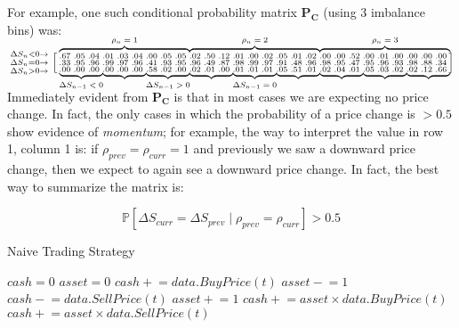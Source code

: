 \documentclass[12pt]{article}
\newcommand{\pluseq}{\mathrel{+}=}
\newcommand{\mineq}{\mathrel{-}=}
\newcommand\undermat[2]{%
  \makebox[0pt][l]{$\smash{\underbrace{\phantom{%
    \begin{smallmatrix}#2\end{smallmatrix}}}_{\text{$#1$}}}$}#2}
\newcommand\overmat[2]{%
  \makebox[0pt][l]{$\smash{\overbrace{\phantom{%
    \begin{smallmatrix}#2\end{smallmatrix}}}^{\text{$#1$}}}$}#2}
\newcommand\mat[1]{\boldsymbol{#1}}
\begin{document}
For example, one such conditional probability matrix $\mat{P_C}$ (using 3 imbalance bins) was:

$$  \begin{smallmatrix}
    \Delta S_n < 0 \rightarrow \\
    \Delta S_n = 0 \rightarrow \\
    \Delta S_n > 0 \rightarrow
  \end{smallmatrix}
  \left [
    \begin{smallmatrix}
\overmat{\rho_n = 1}{.67 & .05 & .04 & .01 & .03 & .04 & .00 & .05 & .05} & \overmat{\rho_n = 2}{.02 & .50 & .12 & .01 & .00 & .02 & .05 & .01 & .02} & 
\overmat{\rho_n = 3}{.00 & .00 & .52 & .00 & .01 & .00 & .00 & .00 & .00} \\
.33 & .95 & .96 & .99 & .97 & .96 & .41 & .93 & .95 & .96 & .49 & .87 & .98 & .99 & .97 & .91 & .48 & .96 & .98 & .95 & .47 & .95 & .96 & .93 & .98 & .88 & .34 \\ \undermat{\Delta S_{n-1} < 0}{.00 & .00 & .00} & 
\undermat{}{.00 & .00 & .00} & 
\undermat{\Delta S_{n-1} > 0}{.58 & .02 & .00} & 
\undermat{}{.02 & .01 & .00} & 
\undermat{\Delta S_{n-1} = 0}{.01 & .01 & .01} & 
\undermat{}{.05 & .51 & .01} & 
\undermat{}{.02 & .04 & .01} & 
\undermat{}{.05 & .03 & .02} & 
\undermat{}{.02 & .12 & .66}
    \end{smallmatrix}
  \right ]
$$

\vspace{0.5cm}
Immediately evident from $\mat{P_C}$ is that in most cases we are expecting no price change. In fact, the only cases in which the probability of a price change is $>0.5$ show evidence of \textit{momentum}; for example, the way to interpret the value in row 1, column 1 is: if $\rho_{prev} = \rho_{curr} = 1$ and previously we saw a downward price change, then we expect to again see a downward price change. In fact, the best way to summarize the matrix is:

$$ \mathbb{P} \left[ \Delta S_{curr} = \Delta S_{prev} \; | \; \rho_{prev} = \rho_{curr} \right] > 0.5 $$

\begin{algorithm}
\caption{Naive Trading Strategy}
\begin{algorithmic}[1]
\State $cash = 0$
\State $asset = 0$
		\State $cash \pluseq data.BuyPrice(\textit{t})$
		\State $asset \mineq 1$
		\State $cash \mineq data.SellPrice(\textit{t})$	
		\State $asset \pluseq 1$
	\EndIf
\EndFor
{} 
	\State $cash \pluseq asset \times data.BuyPrice(\textit{t})$
	\State $cash \pluseq asset \times data.SellPrice(\textit{t})$	
\EndIf
\end{algorithmic}
\end{algorithm}
\end{document}
